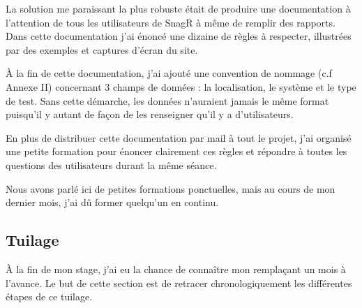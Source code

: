 La solution me paraissant la plus robuste était de produire une documentation à l'attention de tous les utilisateurs de \gls{SnagR} à même de remplir des rapports.
Dans cette documentation j'ai énoncé une dizaine de règles à respecter, illustrées par des exemples et captures d'écran du site.

À la fin de cette documentation, j'ai ajouté une convention de nommage (c.f Annexe II) concernant 3 champs de données : la localisation, le système et le type de test.
Sans cette démarche, les données n'auraient jamais le même format puisqu'il y autant de façon de les renseigner qu'il y a d'utilisateurs.

En plus de distribuer cette documentation par mail à tout le projet, j'ai organisé une petite formation pour énoncer clairement ces règles et répondre à toutes les questions des utilisateurs durant la même séance.

Nous avons parlé ici de petites formations ponctuelles, mais au cours de mon dernier mois, j'ai dû former quelqu'un en continu.

\subsection{Tuilage}

À la fin de mon stage, j'ai eu la chance de connaître mon remplaçant un mois à l'avance. Le but de cette section est de retracer chronologiquement les différentes étapes de ce tuilage.

